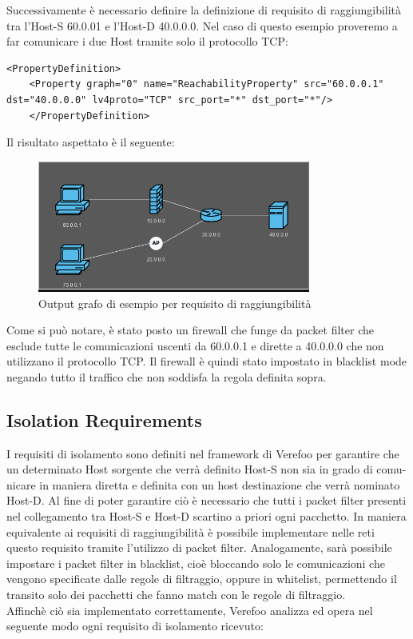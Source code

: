 Successivamente è necessario definire la definizione di requisito di raggiungibilità tra l'Host-S 60.0.01 e l'Host-D 40.0.0.0. Nel caso di questo esempio
proveremo a far comunicare i due Host tramite solo il protocollo TCP:
\begin{lstlisting}[style=mystyle,caption={Esempio di requisito di raggiungibilità}]
    <PropertyDefinition>
    <Property graph="0" name="ReachabilityProperty" src="60.0.0.1" dst="40.0.0.0" lv4proto="TCP" src_port="*" dst_port="*"/>
    </PropertyDefinition>
    \end{lstlisting}
    \newpage
Il risultato aspettato è il seguente:\\
\begin{figure}[h]  %
    \centering
    \includegraphics[width=0.8\textwidth]{Reachability_risolta.png}  %
    \caption{Output grafo di esempio per requisito di raggiungibilità}
    \label{fig:Reachability_Soddisfatta}
  \end{figure}


Come si può notare, è stato posto un firewall che funge da packet filter che esclude tutte le comunicazioni uscenti da 60.0.0.1 e dirette a 40.0.0.0 che non utilizzano
il protocollo TCP. Il firewall è quindi stato impostato in blacklist mode negando tutto il traffico che non soddisfa la regola definita sopra.





\subsection{Isolation Requirements}

I requisiti di isolamento sono definiti nel framework di Verefoo per garantire
che un determinato Host sorgente che verrà definito Host-S non sia in grado di comu-
nicare in maniera diretta e definita con un host destinazione che verrà nominato
Host-D. Al fine di poter garantire ciò è necessario che tutti i packet filter presenti nel collegamento tra
Host-S e Host-D scartino a priori ogni pacchetto. In maniera equivalente ai requisiti di raggiungibilità è possibile
implementare nelle reti questo requisito tramite l'utilizzo di packet filter. Analogamente, sarà possibile impostare i
packet filter in blacklist, cioè bloccando solo le comunicazioni che vengono specificate dalle regole di filtraggio, oppure in 
whitelist, permettendo il transito solo dei pacchetti che fanno match con le regole di filtraggio.\\
Affinchè ciò sia implementato correttamente, Verefoo analizza ed opera nel seguente modo ogni requisito di isolamento ricevuto:

